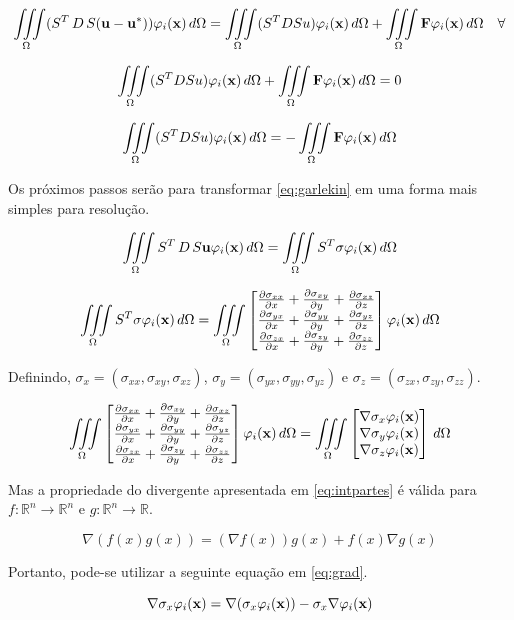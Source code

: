 \begin{equation}
\omeint{(S^T\,D\,S(\mathbf{u - u^*})) \phiix}  =  \omeint{(S^TDSu)\phiix} + \omeint{\mathbf{F}\phiix} \quad \forall
\end{equation}

\begin{equation}
\omeint{(S^TDSu)\phiix} + \omeint{\mathbf{F}\phiix} = 0
\end{equation}

\begin{equation} \label{eq:garlekin}
\omeint{(S^TDSu)\phiix} = - \omeint{\mathbf{F}\phiix}
\end{equation}



Os próximos passos serão para transformar \ref{eq:garlekin} em uma forma mais simples para resolução.

\begin{equation}
\omeint{S^T\,D\,S\mathbf{u} \phiix} = \omeint{S^T\sigma \phiix}
\end{equation}

\begin{equation}
\omeint{S^T\sigma \phiix} = \omeint{\sstensor \phiix}
\end{equation}

Definindo, $\sigma_x = (\sigma_{xx}, \sigma_{xy}, \sigma_{xz})$, $\sigma_y = (\sigma_{yx}, \sigma_{yy}, \sigma_{yz})$ e $\sigma_z = (\sigma_{zx}, \sigma_{zy}, \sigma_{zz})$.

\begin{equation}\label{eq:grad}
\omeint{\sstensor \phiix} = \omeint{
\begin{bmatrix}
\nabla \sigma_x \phiix\\ \nabla \sigma_y \phiix \\ \nabla \sigma_z \phiix
\end{bmatrix}}
\end{equation}

Mas a propriedade do divergente apresentada em \ref{eq:intpartes} é válida para $f:\mathbb{R}^n \rightarrow \mathbb{R}^n$ e $g:\mathbb{R}^n \rightarrow \mathbb{R}$.

\begin{equation} \label{eq:intpartes}
\nabla (f(x)g(x)) = (\nabla f(x)) g(x) + f(x)\nabla g(x)
\end{equation}


Portanto, pode-se utilizar a seguinte equação em \ref{eq:grad}.

\begin{equation}
\nabla \sigma_x \phiix = \nabla (\sigma_x \phiix) - \sigma_x \nabla \phiix
\end{equation}


